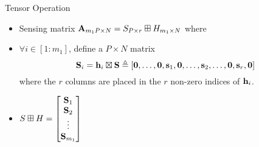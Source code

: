 \begin{frame}{Tensor Operation}
\begin{itemize}
\item Sensing matrix $\mathbf{A}_{m_{1}P\times N}= S_{P\times r}\boxplus H_{m_{1}\times N}$ where
\vspace{2ex}
\item $\forall i\in [1:m_1]$, define a $P\times N$ matrix
\begin{equation*}
\mathbf{S}_i=\mathbf{h}_i \boxtimes \mathbf{S}\triangleq [\mathbf{0},\ldots,\mathbf{0},\mathbf{s}_1,\mathbf{0},\ldots,\mathbf{s}_2,\ldots,\mathbf{0},\mathbf{s}_r,\mathbf{0}]
\end{equation*}
where the $r$ columns are placed in the $r$ non-zero indices of $\mathbf{h}_i$.
\vspace{2ex}
\item $S\boxplus H=\begin{bmatrix}
\mathbf{S}_1\\
\mathbf{S}_2\\
\vdots\\
\mathbf{S}_{m_1}
\end{bmatrix}
$
\end{itemize}
\end{frame}

